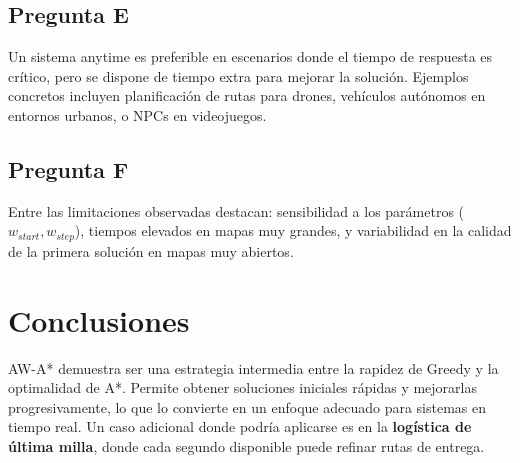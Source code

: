 \documentclass[12pt,a4paper]{article}
\begin{document}
\subsection{Pregunta E}
Un sistema anytime es preferible en escenarios donde el tiempo de respuesta es crítico, pero se dispone de tiempo extra para mejorar la solución. 
Ejemplos concretos incluyen planificación de rutas para drones, vehículos autónomos en entornos urbanos, o NPCs en videojuegos.

\subsection{Pregunta F}
Entre las limitaciones observadas destacan: sensibilidad a los parámetros ($w_{start}, w_{step}$), 
tiempos elevados en mapas muy grandes, y variabilidad en la calidad de la primera solución en mapas muy abiertos.

\section{Conclusiones}
AW-A* demuestra ser una estrategia intermedia entre la rapidez de Greedy y la optimalidad de A*. 
Permite obtener soluciones iniciales rápidas y mejorarlas progresivamente, lo que lo convierte en un enfoque adecuado para sistemas en tiempo real. 
Un caso adicional donde podría aplicarse es en la \textbf{logística de última milla}, donde cada segundo disponible puede refinar rutas de entrega.
\end{document}
